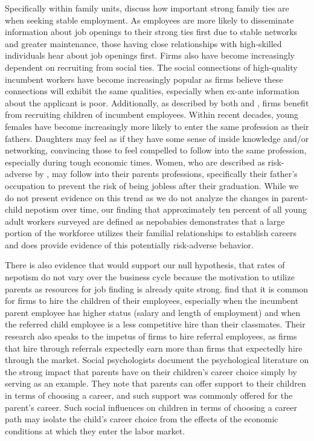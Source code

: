 \documentclass[12pt]{article}
\begin{document}
Specifically within family units, \cite{kramarz_when_2014} discuss how important strong family ties are when seeking stable employment. As employees are more likely to disseminate information about job openings to their strong ties first due to stable networks and greater maintenance, those having close relationships with high-skilled individuals hear about job openings first. Firms also have become increasingly dependent on recruiting from social ties. The social connections of high-quality incumbent workers have become increasingly popular as firms believe these connections will exhibit the same qualities, especially when ex-ante information about the applicant is poor. Additionally, as described by both \cite{kramarz_when_2014} and \cite{hellerstein_dads_2011}, firms benefit from recruiting children of incumbent employees. Within recent decades, young females have become increasingly more likely to enter the same profession as their fathers. Daughters may feel as if they have some sense of inside knowledge and/or networking, convincing those to feel compelled to follow into the same profession, especially during tough economic times. Women, who are described as risk-adverse by \cite{hellerstein_dads_2011}, may follow into their parents professions, specifically their father’s occupation to prevent the risk of being jobless after their graduation. While we do not present evidence on this trend as we do not analyze the changes in parent-child nepotism over time, our finding that approximately ten percent of all young adult workers surveyed are defined as nepobabies demonstrates that a large portion of the workforce utilizes their familial relationships to establish careers and does provide evidence of this potentially risk-adverse behavior.

There is also evidence that would support our null hypothesis, that rates of nepotism do not vary over the business cycle because the motivation to utilize parents as resources for job finding is already quite strong. \cite{kramarz2006nepotism} find that it is common for firms to hire the children of their employees, especially when the incumbent parent employee has higher status (salary and length of employment) and when the referred child employee is a less competitive hire than their classmates. Their research also speaks to the impetus of firms to hire referral employees, as firms that hire through referrals expectedly earn more than firms that expectedly hire through the market. Social psychologists \cite{vanhooft_nepotism_2011} document the psychological literature on the strong impact that parents have on their children's career choice simply by serving as an example. They note that parents can offer support to their children in terms of choosing a career, and such support was commonly offered for the parent's career. Such social influences on children in terms of choosing a career path may isolate the child's career choice from the effects of the economic conditions at which they enter the labor market.
\end{document}

